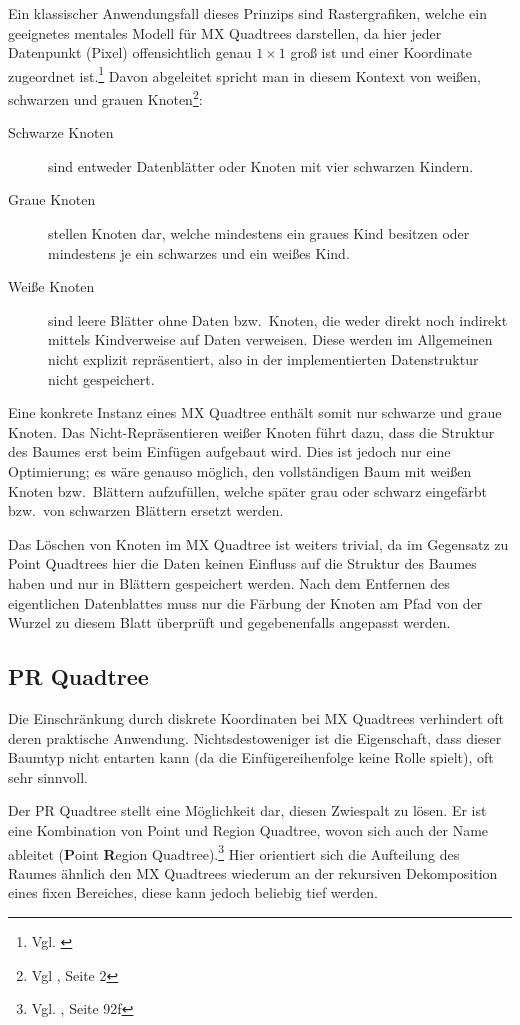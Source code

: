 \documentclass[%
			paper=a4,%
			DIV12,
			liststotoc,
			bibtotoc,
			draft=false,%
			titlepage,
			numbers=noendperiod
			]{scrartcl}
\newcommand{\zit}[3]{#1 \cite{#2}, #3}
\newcommand{\zitx}[2]{#1 \cite{#2}}
\newcommand{\footzit}[3]{\footnote{\zit{#1}{#2}{#3}}}
\newcommand{\footzitx}[2]{\footnote{\zitx{#1}{#2}}}
\begin{document}
Ein klassischer Anwendungsfall dieses Prinzips sind Rastergrafiken, welche ein geeignetes mentales Modell für MX Quadtrees darstellen, da hier jeder Datenpunkt  (Pixel) offensichtlich genau $1\times1$ groß ist und einer Koordinate zugeordnet ist.\footzitx{Vgl.}{bb29082}
Davon abgeleitet spricht man in diesem Kontext von weißen, schwarzen und grauen Knoten\footzit{Vgl}{DBLP:journals/cacm/Gargantini82}{Seite 2}:%
\label{coloring}
\begin{description}
	\item[Schwarze Knoten] sind entweder Datenblätter oder Knoten mit vier schwarzen Kindern.
	\item[Graue Knoten] stellen Knoten dar, welche mindestens ein graues Kind besitzen oder mindestens je ein schwarzes und ein weißes Kind.
	\item[Weiße Knoten] sind leere Blätter ohne Daten bzw.\ Knoten, die weder direkt noch indirekt mittels Kindverweise auf Daten verweisen. Diese werden im Allgemeinen nicht explizit repräsentiert, also in der implementierten Datenstruktur nicht gespeichert.
\end{description}

Eine konkrete Instanz eines MX Quadtree enthält somit nur schwarze und graue Knoten.
Das Nicht-Repräsentieren weißer Knoten führt dazu, dass die Struktur des Baumes erst beim Einfügen aufgebaut wird.
Dies ist jedoch nur eine Optimierung; es wäre genauso möglich, den vollständigen Baum mit weißen Knoten bzw.\ Blättern aufzufüllen, welche später grau oder schwarz eingefärbt bzw.\ von schwarzen Blättern ersetzt werden.

Das Löschen von Knoten im MX Quadtree ist weiters trivial, da im Gegensatz zu Point Quadtrees hier die Daten keinen Einfluss auf die Struktur des Baumes haben und nur in Blättern gespeichert werden. Nach dem Entfernen des eigentlichen Datenblattes muss nur die Färbung der Knoten am Pfad von der Wurzel zu diesem Blatt überprüft und gegebenenfalls angepasst werden.

\subsection{PR Quadtree}

Die Einschränkung durch diskrete Koordinaten bei MX Quadtrees verhindert oft deren praktische Anwendung.
Nichtsdestoweniger ist die Eigenschaft, dass dieser Baumtyp nicht entarten kann (da die Einfügereihenfolge keine Rolle spielt), oft sehr sinnvoll. 

Der PR Quadtree stellt eine Möglichkeit dar, diesen Zwiespalt zu lösen. 
Er ist eine Kombination von Point und Region Quadtree, wovon sich auch der Name ableitet (\textbf{P}oint \textbf{R}egion Quadtree).\footzit{Vgl.}{Samet90}{Seite 92f}
Hier orientiert sich die Aufteilung des Raumes ähnlich den MX Quadtrees wiederum an der rekursiven Dekomposition eines fixen Bereiches, diese kann jedoch beliebig tief werden.
\end{document}

